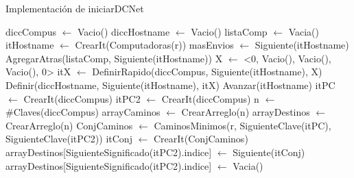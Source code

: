 \begin{Algoritmos}
\begin{algorithm}
\caption{Implementaci\'on de iniciarDCNet}
\begin{algorithmic}[0]
	\State diccCompus $\gets$ Vacio()  
	\State diccHostname $\gets$ Vacio()  
	\State listaComp $\gets$ Vacia() 
	\State itHostname $\gets$  CrearIt(Computadoras(r)) 
	\State masEnvios $\gets$ Siguiente(itHostname) 
	 
		\State AgregarAtras(listaComp, Siguiente(itHostname)) 
		\State X $\gets$ <0, Vacio(), Vacio(), Vacio(), 0> 
		\State itX $\gets$ DefinirRapido(diccCompus, Siguiente(itHostname), X)   
		\State Definir(diccHostname, Siguiente(itHostname), itX)  
		\State Avanzar(itHostname) 
	\EndWhile
	\State itPC $\gets$ CrearIt(diccCompus) 
	\State itPC2 $\gets$ CrearIt(diccCompus) 				 	 	
	\State n $\gets$ \#Claves(diccCompus) 
	\State arrayCaminos $\gets$ CrearArreglo(n) 
	 
		\State arrayDestinos $\gets$ CrearArreglo(n) 
		 
			\State ConjCaminos $\gets$ CaminosMinimos(r, SiguienteClave(itPC), SiguienteClave(itPC2)) 
			\State itConj $\gets$ CrearIt(ConjCaminos) 
			   
				\State arrayDestinos[SiguienteSignificado(itPC2).indice] $\gets$ Siguiente(itConj) 
			\Else 
				\State arrayDestinos[SiguienteSignificado(itPC2).indice] $\gets$ Vacia() 
			\EndIf
			

\end{algorithmic}
\end{algorithm}
\end{Algoritmos}
